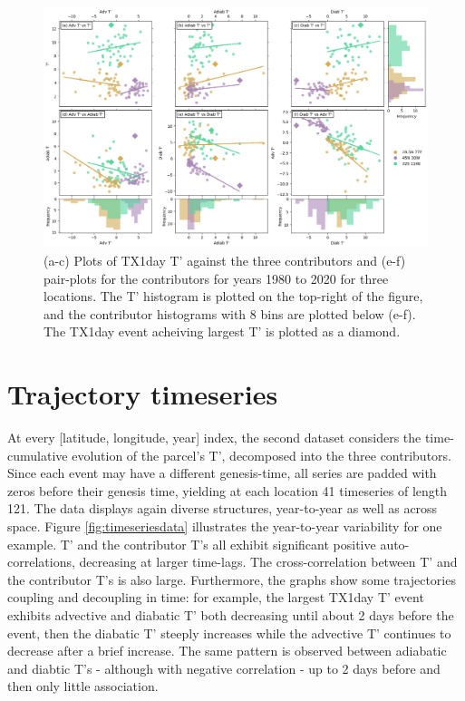 \documentclass[11pt,a4paper,twoside,openright]{report}
\theoremstyle{definition}
\begin{document}
\begin{figure}[h]
\includegraphics[width=1\linewidth]{images/flat_data} \caption{(a-c) Plots of TX1day T' against the three contributors and (e-f) pair-plots for the contributors for years 1980 to 2020 for three locations. The T' histogram is plotted on the top-right of the figure, and the contributor histograms with 8 bins are plotted below (e-f). The TX1day event acheiving largest T' is plotted as a diamond.}\label{fig:flatdata}
\end{figure}

\section{Trajectory timeseries}\label{trajectory-timeseries}

At every {[}latitude, longitude, year{]} index, the second dataset considers the time-cumulative evolution of the parcel's T', decomposed into the three contributors. Since each event may have a different genesis-time, all series are padded with zeros before their genesis time, yielding at each location 41 timeseries of length 121. The data displays again diverse structures, year-to-year as well as across space. Figure \ref{fig:timeseriesdata} illustrates the year-to-year variability for one example. T' and the contributor T's all exhibit significant positive auto-correlations, decreasing at larger time-lags. The cross-correlation between T' and the contributor T's is also large. Furthermore, the graphs show some trajectories coupling and decoupling in time: for example, the largest TX1day T' event exhibits advective and diabatic T' both decreasing until about 2 days before the event, then the diabatic T' steeply increases while the advective T' continues to decrease after a brief increase. The same pattern is observed between adiabatic and diabtic T's - although with negative correlation - up to 2 days before and then only little association.
\end{document}
